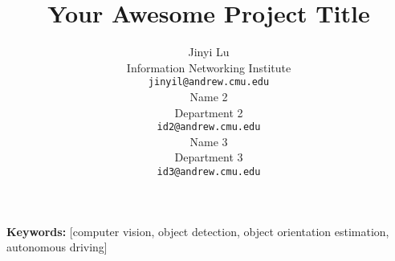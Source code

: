 \documentclass{article}
\title{Your Awesome Project Title}
\author{
  Jinyi Lu \\
  Information Networking Institute \\
  \texttt{jinyil@andrew.cmu.edu} \\
  \And
  Name 2 \\
  Department 2\\
  \texttt{id2@andrew.cmu.edu} \\
  \And
  Name 3\\
  Department 3\\
  \texttt{id3@andrew.cmu.edu} \\
}
\begin{document}


\maketitle


\textbf{Keywords:} [computer vision, object detection, object orientation estimation, autonomous driving]







\end{document}

